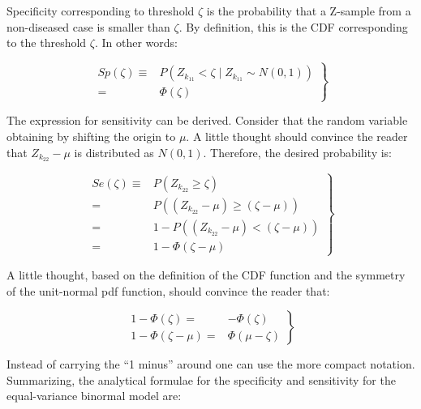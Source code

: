 \documentclass[
]{book}
\begin{document}
Specificity corresponding to threshold \(\zeta\) is the probability that a Z-sample from a non-diseased case is smaller than \(\zeta\). By definition, this is the CDF corresponding to the threshold \(\zeta\). In other words:

\begin{equation} 
\left.
\begin{aligned}  
Sp\left ( \zeta \right ) \equiv& P\left ( Z_{k_11} < \zeta\mid Z_{k_11} \sim N\left ( 0,1 \right )\right ) \\
=& \Phi\left ( \zeta \right )
\end{aligned}
\right \}
\label{eq:binary-task-model-specificity}
\end{equation}

The expression for sensitivity can be derived. Consider that the random variable obtaining by shifting the origin to \(\mu\). A little thought should convince the reader that \(Z_{k_22}-\mu\) is distributed as \(N(0,1)\). Therefore, the desired probability is:

\begin{equation} 
\left.
\begin{aligned}  
Se\left ( \zeta \right ) \equiv& P\left ( Z_{k_22} \geq \zeta\right ) \\
=&P\left (\left ( Z_{k_22} -\mu  \right ) \geq\left ( \zeta -\mu  \right )\right ) \\
=&1-P\left (\left ( Z_{k_22} -\mu  \right ) < \left ( \zeta -\mu  \right )\right ) \\
=& 1-\Phi\left ( \zeta -\mu \right )
\end{aligned}
\right \}
\label{eq:binary-task-model-sensitivity}
\end{equation}

A little thought, based on the definition of the CDF function and the symmetry of the unit-normal pdf function, should convince the reader that:

\begin{equation} 
\left.
\begin{aligned}  
1-\Phi(\zeta)=& -\Phi(\zeta)\\
1-\Phi(\zeta-\mu) =& \Phi(\mu-\zeta)
\end{aligned}
\right \}
\label{eq:binary-task-model-compact}
\end{equation}

Instead of carrying the ``1 minus'' around one can use the more compact notation. Summarizing, the analytical formulae for the specificity and sensitivity for the equal-variance binormal model are:
\end{document}
